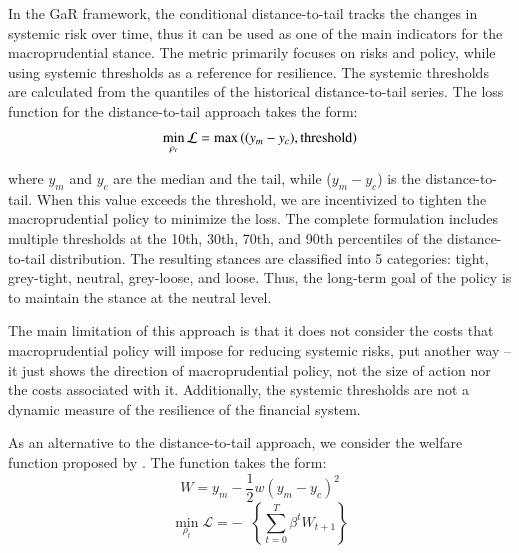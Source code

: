In the GaR framework, the conditional distance-to-tail tracks the changes in systemic risk over time, thus it can be used as one of the main indicators for the macroprudential stance. The metric primarily focuses on risks and policy, while using systemic thresholds as a reference for resilience. The systemic thresholds are calculated from the quantiles of the historical distance-to-tail series. The loss function for the distance-to-tail approach takes the form:
\begin{equation}
    \label{eq:dt_loss}
    \min_{\rho_t}\mathcal{L} = \max{\left((y_m - y_c), \textnormal{threshold}\right)}
\end{equation}

where $y_m$ and $y_c$ are the median and the tail, while ($y_m-y_c$) is the distance-to-tail. When this value exceeds the threshold, we are incentivized to tighten the macroprudential policy to minimize the loss. The complete \citet{esrb2024} formulation includes multiple thresholds at the 10th, 30th, 70th, and 90th percentiles of the distance-to-tail distribution. The resulting stances are classified into 5 categories: tight, grey-tight, neutral, grey-loose, and loose. Thus, the long-term goal of the policy is to maintain the stance at the neutral level.

The main limitation of this approach is that it does not consider the costs that macroprudential policy will impose for reducing systemic risks, put another way – it just shows the direction of macroprudential policy, not the size of action nor the costs associated with it. Additionally, the systemic thresholds are not a dynamic measure of the resilience of the financial system. 

As an alternative to the distance-to-tail approach, we consider the welfare function proposed by \citet{suarez2022}. The function takes the form:
\begin{equation}
    \label{eq:suarez_W}
    W = y_m - \frac{1}{2}w\left(y_m - y_c\right)^2
\end{equation}
\begin{equation}
    \label{eq:suarez_loss}
    \min_{\rho_t}\mathcal{L} = -\mathop{\mathbb{E}_t}\left\{\sum_{t=0}^{T}\beta^tW_{t+1}\right\}
\end{equation}

